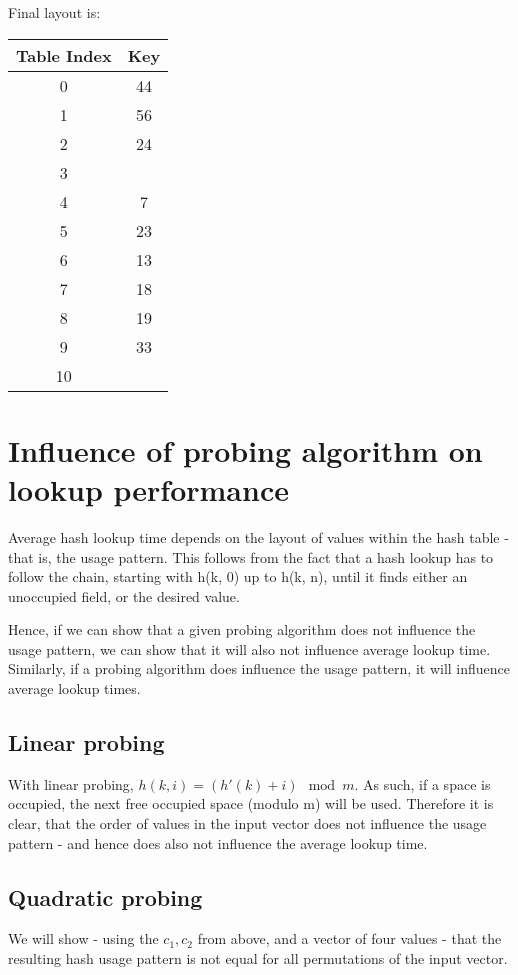\documentclass[a4paper]{scrartcl}
\begin{document}
Final layout is:

\begin{tabular}{|c|c|}
	\hline
	Table Index & Key \\
	\hline
	0 & 44 \\
	1 & 56 \\
	2 & 24 \\
	3 & \\
	4 & 7 \\
	5 & 23 \\
	6 & 13 \\
	7 & 18 \\
	8 & 19 \\
	9 & 33 \\
	10 & \\
	\hline
\end{tabular}

\section{Influence of probing algorithm on lookup performance}

Average hash lookup time depends on the layout of values within the hash table
- that is, the usage pattern. This follows from the fact that a hash lookup has
to follow the chain, starting with h(k, 0) up to h(k, n), until it finds either
an unoccupied field, or the desired value.

Hence, if we can show that a given probing algorithm does not influence the
usage pattern, we can show that it will also not influence average lookup time.
Similarly, if a probing algorithm does influence the usage pattern, it will
influence average lookup times.

\subsection{Linear probing}

With linear probing, $h(k, i) = (h'(k) + i) \mod m$. As such, if a space is
occupied, the next free occupied space (modulo m) will be used. Therefore it is
clear, that the order of values in the input vector does not influence the
usage pattern - and hence does also not influence the average lookup time.

\subsection{Quadratic probing}

We will show - using the $c_1, c_2$ from above, and a vector of four values -
that the resulting hash usage pattern is not equal for all permutations of
the input vector.
\end{document}
